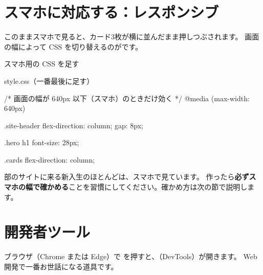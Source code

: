 \section{スマホに対応する：レスポンシブ}

このままスマホで見ると、カード3枚が横に並んだまま押しつぶされます。
画面の幅によって CSS を切り替えるのがです。

\begin{step}{スマホ用の CSS を足す}
\begin{filebox}{style.css（一番最後に足す）}
\begin{Piton}[language=code]
/* 画面の幅が 640px 以下（スマホ）のときだけ効く */
@media (max-width: 640px) {
  .site-header {
    flex-direction: column;
    gap: 8px;
  }

  .hero h1 {
    font-size: 28px;
  }

  .cards {
    flex-direction: column;
  }
}
\end{Piton}
\end{filebox}
\end{step}

\begin{tip}[新入生はスマホで見る]
部のサイトに来る新入生のほとんどは、スマホで見ています。
作ったら\textbf{必ずスマホの幅で確かめる}ことを習慣にしてください。確かめ方は次の節で説明します。
\end{tip}

\section{開発者ツール}

ブラウザ（Chrome または Edge）で  を押すと、（DevTools）が開きます。
Web 開発で一番お世話になる道具です。

